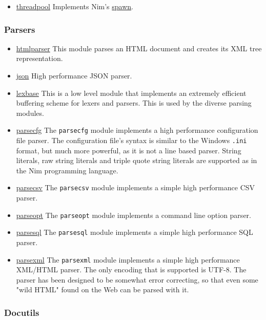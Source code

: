 \begin{itemize}
\tightlist
\item
  \href{threadpool.html}{threadpool} Implements Nim's
  \href{manual_experimental.html\#parallel-amp-spawn}{spawn}.
\end{itemize}

\hypertarget{parsers}{%
\subsubsection{Parsers}\label{parsers}}

\begin{itemize}
\tightlist
\item
  \href{htmlparser.html}{htmlparser} This module parses an HTML document
  and creates its XML tree representation.
\item
  \href{json.html}{json} High performance JSON parser.
\item
  \href{lexbase.html}{lexbase} This is a low level module that
  implements an extremely efficient buffering scheme for lexers and
  parsers. This is used by the diverse parsing modules.
\item
  \href{parsecfg.html}{parsecfg} The \texttt{parsecfg} module implements
  a high performance configuration file parser. The configuration file's
  syntax is similar to the Windows \texttt{.ini} format, but much more
  powerful, as it is not a line based parser. String literals, raw
  string literals and triple quote string literals are supported as in
  the Nim programming language.
\item
  \href{parsecsv.html}{parsecsv} The \texttt{parsecsv} module implements
  a simple high performance CSV parser.
\item
  \href{parseopt.html}{parseopt} The \texttt{parseopt} module implements
  a command line option parser.
\item
  \href{parsesql.html}{parsesql} The \texttt{parsesql} module implements
  a simple high performance SQL parser.
\item
  \href{parsexml.html}{parsexml} The \texttt{parsexml} module implements
  a simple high performance XML/HTML parser. The only encoding that is
  supported is UTF-8. The parser has been designed to be somewhat error
  correcting, so that even some "wild HTML" found on the Web can be
  parsed with it.
\end{itemize}

\hypertarget{docutils}{%
\subsubsection{Docutils}\label{docutils}}

